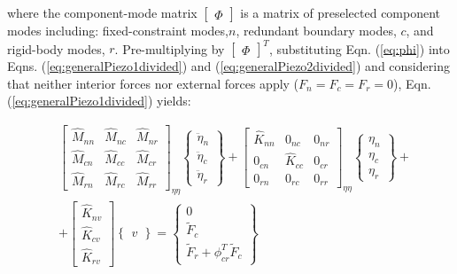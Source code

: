 \documentclass{ifacconf}
\begin{document}
where the component-mode matrix $\begin{bmatrix}
\Phi \end{bmatrix}$ is a matrix of preselected
component modes including: fixed-constraint modes,$n$,
redundant boundary modes, $c$, and rigid-body modes, $r$. Pre-multiplying by $\begin{bmatrix}
\Phi \end{bmatrix}^T$, substituting Eqn. (\ref{eq:phi}) into Eqns.  (\ref{eq:generalPiezo1divided}) and (\ref{eq:generalPiezo2divided}) and considering that neither interior forces nor external forces apply ($F_n=F_c=F_r=0$), Eqn. (\ref{eq:generalPiezo1divided}) yields:

\small
\begin{equation}
\begin{split}
\label{eq:generalPiezo1normed}
& \begin{bmatrix} \hat{M}_{nn} & \hat{M}_{nc} & \hat{M}_{nr} \\ \hat{M}_{cn} & \hat{M}_{cc} & \hat{M}_{cr} \\ \hat{M}_{rn} & \hat{M}_{rc} & \hat{M}_{rr}\end{bmatrix}_{\eta\eta} \begin{Bmatrix} \ddot{\eta}_n \\ \ddot{\eta}_c \\ \ddot{\eta}_r  \end{Bmatrix} + \begin{bmatrix} \hat{K}_{nn} & 0_{nc} & 0_{nr} \\ 0_{cn} & \hat{K}_{cc} & 0_{cr} \\ 0_{rn} & 0_{rc} & 0_{rr}\end{bmatrix}_{\eta\eta} \begin{Bmatrix} \eta_n \\ \eta_c \\ \eta_r  \end{Bmatrix} + \\ & + \begin{bmatrix}\hat{K}_{nv} \\ \hat{K}_{cv}  \\ \hat{K}_{rv}  \end{bmatrix} \begin{Bmatrix} v \end{Bmatrix} = \begin{Bmatrix} 0\\ \tilde{F}_c \\ \tilde{F}_r + \phi_{cr}^T \tilde{F}_c \end{Bmatrix}
\end{split}
\end{equation}
\end{document}
